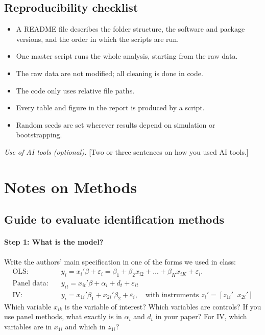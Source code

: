 \documentclass[12pt,a4paper]{article}
\newif\ifshowinstr
\newcommand{\instr}[1]{\ifshowinstr{\leavevmode\color{gray}\itshape\small [#1]\par}\fi}
\begin{document}
\subsection{Reproducibility checklist}

\begin{itemize}[label=$\square$, leftmargin=*, itemsep=2pt]
  \item A README file describes the folder structure, the software and package versions, and the order in which the scripts are run.
  \item One master script runs the whole analysis, starting from the raw data.
  \item The raw data are not modified; all cleaning is done in code.
  \item The code only uses relative file paths.
  \item Every table and figure in the report is produced by a script.
  \item Random seeds are set wherever results depend on simulation or bootstrapping.
\end{itemize}

\textit{Use of AI tools (optional).} [Two or three sentences on how you used AI
tools.]

\clearpage
\section{Notes on Methods}

\instr{Delete this appendix before submitting.}

\subsection{Guide to evaluate identification methods}


\paragraph{Step 1: What is the model?}
Write the authors' main specification in one of the forms we used in class:
\begin{align*}
  \text{OLS:} \quad & y_i = x_i'\beta + \varepsilon_i = \beta_1 + \beta_2 x_{i2} + \dots + \beta_K x_{iK} + \varepsilon_i . \\
  \text{Panel data:} \quad & y_{it} = x_{it}'\beta + \alpha_i + d_t + \varepsilon_{it} \\
  \text{IV:} \quad & y_i = x_{1i}'\beta_1 + x_{2i}'\beta_2 + \varepsilon_i,
     \quad \text{with instruments } z_i' = [z_{1i}' \;\; x_{2i}']
\end{align*}
Which variable $x_{ik}$ is the variable of interest? Which variables are controls? If you use panel methods, what exactly is in $\alpha_i$ and $d_t$ in your paper? For IV, which variables are in $x_{1i}$ and which in $z_{1i}$?
 
\end{document}
